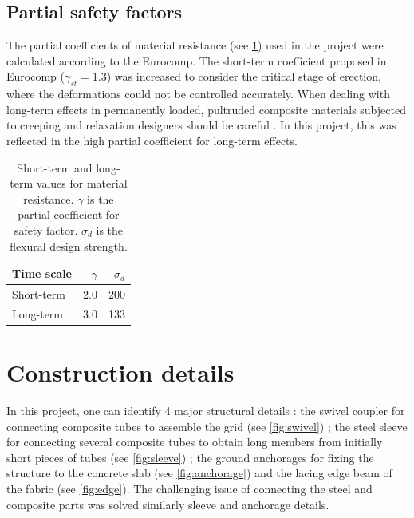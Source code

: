 \subsection{Partial safety factors}\label{sec:safety}
The partial coefficients of material resistance (see \cref{tab:gamma}) used in the project were calculated according to the Eurocomp. The short-term coefficient proposed in Eurocomp ($\gamma_{st} = 1.3$) was increased to consider the critical stage of erection, where the deformations could not be controlled accurately.
When dealing with long-term effects in permanently loaded, pultruded composite materials subjected to creeping and relaxation designers should be careful  \cite{Kotelnikova2012,Bank2006}. In this project, this was reflected in the high partial coefficient for long-term effects.
\bigskip
\begin{table}[h]
\centering
 	\begin{tabular}{@{}l r r @{}}
	\toprule
	Time scale 	& $\gamma$		& $\sigma_{d}$\\
	\midrule
	Short-term 	& $ 2.0$ 			& 200 \\
	Long-term 	& $ 3.0$ 			& 133 \\
	\bottomrule
	\end{tabular}
	\caption[Short-term and long-term values for material resistance]{Short-term and long-term values for material resistance. $\gamma$ is the partial coefficient for safety factor. $\sigma_{d}$ is the flexural design strength.}
	\label{tab:gamma}
\end{table}




\section{Construction details}
In this project, one can identify 4 major structural details : the swivel coupler for connecting composite tubes to assemble the grid (see \cref{fig:swivel}) ; the steel sleeve for connecting several composite tubes to obtain long members from initially short pieces of tubes (see \cref{fig:sleeve}) ; the ground anchorages for fixing the structure to the concrete slab (see \cref{fig:anchorage}) and the lacing edge beam of the fabric (see \autoref{fig:edge}). The challenging issue of connecting the steel and composite parts was solved similarly sleeve and anchorage details.

